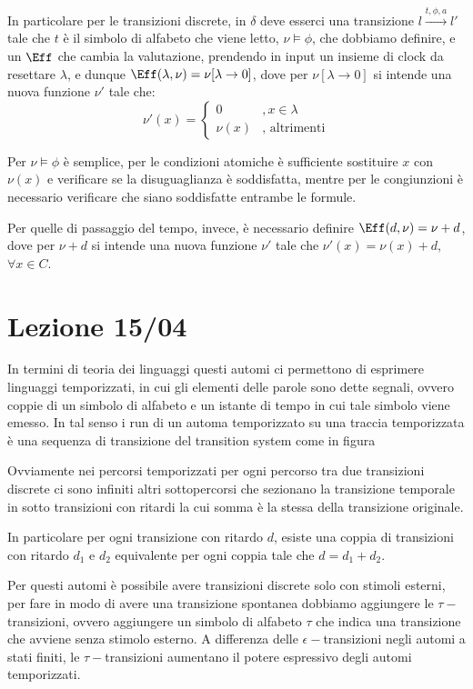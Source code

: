 In particolare per le transizioni discrete, in \(\delta\) deve esserci una transizione \(l \xrightarrow{t, \phi, a} l'\) tale che \(t\) è il simbolo di alfabeto che viene letto, \(\nu\models\phi\), che dobbiamo definire, e un \(\Eff\) che cambia la valutazione, prendendo in input un insieme di clock da resettare \(\lambda\), e dunque \(\Eff(\lambda, \nu) = \nu[\lambda \to 0]\), dove per \(\nu[\lambda \to 0]\) si intende una nuova funzione \(\nu'\) tale che:
\[\nu'(x) = \begin{cases}
    0      & ,x \in \lambda      \\
    \nu(x) & ,\text{ altrimenti}
  \end{cases}\]

Per \(\nu\models\phi\) è semplice, per le condizioni atomiche è sufficiente sostituire \(x\) con \(\nu(x)\) e verificare se la disuguaglianza è soddisfatta, mentre per le congiunzioni è necessario verificare che siano soddisfatte entrambe le formule.

Per quelle di passaggio del tempo, invece, è necessario definire \(\Eff(d,\nu) = \nu + d\), dove per \(\nu + d\) si intende una nuova funzione \(\nu'\) tale che \(\nu'(x) = \nu(x)+d\), \(\forall x \in C\).

\chapter{Lezione 15/04}

In termini di teoria dei linguaggi questi automi ci permettono di esprimere linguaggi temporizzati, in cui gli elementi delle parole sono dette segnali, ovvero coppie di un simbolo di alfabeto e un istante di tempo in cui tale simbolo viene emesso. In tal senso i run di un automa temporizzato su una traccia temporizzata è una sequenza di transizione del transition system come in figura


Ovviamente nei percorsi temporizzati per ogni percorso tra due transizioni discrete ci sono infiniti altri sottopercorsi che sezionano la transizione temporale in sotto transizioni con ritardi la cui somma è la stessa della transizione originale.

In particolare per ogni transizione con ritardo \(d\), esiste una coppia di transizioni con ritardo \(d_1\) e \(d_2\) equivalente per ogni coppia tale che \(d=d_1+d_2\).

Per questi automi è possibile avere transizioni discrete solo con stimoli esterni, per fare in modo di avere una transizione spontanea dobbiamo aggiungere le \(\tau-\)transizioni, ovvero aggiungere un simbolo di alfabeto \(\tau\) che indica una transizione che avviene senza stimolo esterno. A differenza delle \(\epsilon-\)transizioni negli automi a stati finiti, le \(\tau-\)transizioni aumentano il potere espressivo degli automi temporizzati.


